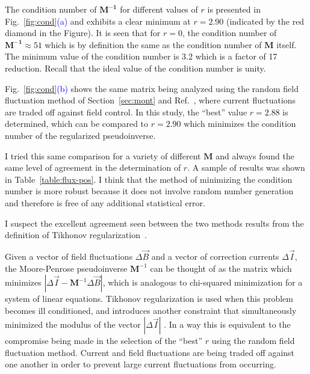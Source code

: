 
The condition number of $\bm{M^{-1}}$ for different values of $r$ is
presented in Fig.~\ref{fig:cond}\textcolor{blue}{(a)} and exhibits a
clear minimum at $r=2.90$ (indicated by the red diamond in the
Figure).  It is seen that for $r=0$, the condition number of
$\bm{M^{-1}}\approx 51$ which is by definition the same as the
condition number of $\bm{M}$ itself.  The minimum value of the
condition number is 3.2 which is a factor of 17 reduction.  Recall
that the ideal value of the condition number is unity.

Fig.~\ref{fig:cond}\textcolor{blue}{(b)} shows the same matrix being
analyzed using the random field fluctuation method of
Section~\ref{sec:mont} and Ref.~\cite{bea}, where current fluctuations
are traded off against field control.  In this study, the ``best''
value $r=2.88$ is determined, which can be compared to $r=2.90$ which
minimizes the condition number of the regularized pseudoinverse.

I tried this same comparison for a variety of different $\bm{M}$ and
always found the same level of agreement in the determination of $r$.
A sample of results was shown in Table~\ref{table:flux-pos}.  I think
that the method of minimizing the condition number is more robust
because it does not involve random number generation and therefore is
free of any additional statistical error.

I suspect the excellent agreement seen between the two methods results
from the definition of Tikhonov
regularization~\cite{tikhonov2013numerical,tikhonov_book,svd,svd3}.

Given a vector of field fluctuations $\Delta\vec{B}$ and a vector of
correction currents $\Delta\vec{I}$, the Moore-Penrose pseudoinverse
$\bm{M}^{-1}$ can be thought of as the matrix which minimizes
$|\Delta\vec{I}-\bm{M}^{-1}\Delta\vec{B}|$, which is analogous to
chi-squared minimization for a system of linear equations.  Tikhonov
regularization is used when this problem becomes ill conditioned, and
introduces another constraint that simultaneously minimized the modulus of the vector
$|\Delta\vec{I}|$ . In a way this is equivalent to the compromise being
made in the selection of the ``best'' $r$ using the random field
fluctuation method.  Current and field fluctuations are being traded
off against one another in order to prevent large current fluctuations
from occurring.




